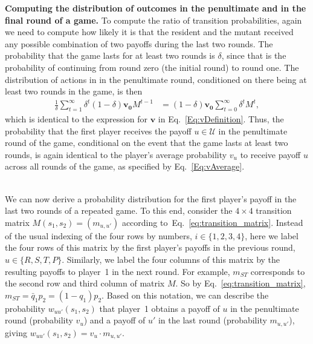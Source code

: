 \documentclass[11pt]{article}
\def\strategy{s}
\theoremstyle{plainCl1}
\theoremstyle{plainCl2}
\begin{document}

\noindent
{\bf Computing the distribution of outcomes in the penultimate and in the final round of a game.}
To compute the ratio of transition probabilities, again we need to compute how likely it is that the resident and the mutant received any possible combination of two payoffs during the last two rounds. 
The probability that the game lasts for at least two rounds is $\delta$, since that is the probability of continuing from round zero (the initial round) to round one. The distribution of actions in in the penultimate round, conditioned on there being at least two rounds in the game, is then
\begin{align}
	\frac{1}{\delta} \sum_{t=1}^{\infty} \delta^{t}\left(1-\delta\right) \mathbf{v_{0}} M^{t-1} &= \left(1-\delta\right)\mathbf{v_{0}}\sum_{t=0}^{\infty}\delta^{t}M^{t} ,
\end{align}
which is identical to the expression for $\mathbf{v}$ in Eq.~\eqref{Eq:vDefinition}.
Thus, the probability that the first player receives the payoff $u\!\in\!\mathcal{U}$ in the penultimate round of the game, conditional on the event that the game lasts at least two rounds, is again identical to the player's average probability $v_u$ to receive payoff $u$ across all rounds of the game, as specified by Eq.~\eqref{Eq:vAverage}.


~\\
\noindent
We can now derive a probability distribution for the first player's payoff in the last two rounds of a repeated game. 
To this end, consider the $4\times4$ transition matrix $M(\strategy_1,\strategy_2)=(m_{u,u'})$ according to~Eq.~\eqref{eq:transition_matrix}. 
Instead of the usual indexing of the four rows by numbers, $i\!\in\!\{1,2,3,4\}$, here we label the four rows of this matrix by the first player's payoffs in the previous round, $u\!\in\!\{R,S,T,P\}$. 
Similarly, we label the four columns of this matrix by the resulting payoffs to player~1 in the next round. 
For example, $m_{ST}$ corresponds to the second row and third column of matrix $M$. 
So by Eq.~\eqref{eq:transition_matrix}, $m_{ST} = \bar{q}_1 p_2=(1\!-\!q_1)p_2$.
Based on this notation, we can describe the probability $w_{uu'}(\strategy_1,\strategy_2)$ that player~1 obtains a payoff of $u$ in the penultimate round (probability $v_{u}$) and a payoff of $u'$ in the last round (probability $m_{u,u'}$), giving $w_{uu'}(\strategy_1,\strategy_2) = v_u \cdot m_{u,u'}$.
\end{document}

